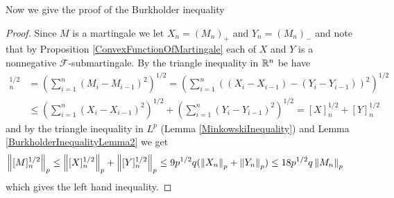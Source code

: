 Now we give the proof of the Burkholder inequality
\begin{proof}
Since $M$ is a martingale we let $X_n = (M_n)_+$ and $Y_n=(M_n)_-$ and note that
by Proposition \ref{ConvexFunctionOfMartingale} each of $X$ and $Y$ is a nonnegative
$\mathcal{F}$-submartingale.  By the triangle inequality in $\mathbb{R}^n$ be have
\begin{align*}
[M]_n^{1/2} &= \left( \sum_{i=1}^n (M_i - M_{i-1})^2 \right)^{1/2} = \left( \sum_{i=1}^n ((X_i - X_{i-1}) - (Y_i-Y_{i-1}))^2 \right)^{1/2} \\
&\leq \left( \sum_{i=1}^n (X_i - X_{i-1})^2 \right)^{1/2} + \left( \sum_{i=1}^n (Y_i-Y_{i-1})^2 \right)^{1/2} = [X]_n^{1/2} + [Y]_n^{1/2}
\end{align*}
and by the triangle inequality in $L^p$ (Lemma \ref{MinkowskiInequality}) and Lemma \ref{BurkholderInequalityLemma2} we get
\begin{align*}
\left \lVert [M]_n^{1/2} \right \rVert_p 
&\leq \left \lVert [X]_n^{1/2} \right \rVert_p + \left \lVert [Y]_n^{1/2} \right \rVert_p 
\leq 9 p^{1/2} q (\left \lVert X_n \right \rVert_p + \left \lVert Y_n \right \rVert_p) 
\leq 18 p^{1/2} q \left \lVert M_n \right \rVert_p
\end{align*}
which gives the left hand inequality.  


\end{proof}
